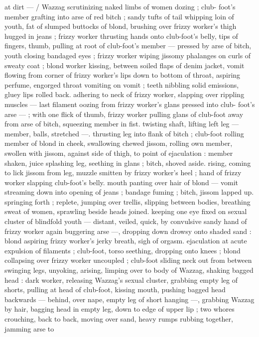 at dirt --- / Wazzag scrutinizing naked limbs of women dozing ; club-
foot's member grafting into arse of red bitch ; sandy tufts of tail
whipping loin of youth, fat of slumped buttocks of blond, brushing
over frizzy worker's thigh hugged in jeans ; frizzy worker thrusting
hands onto club-foot's belly, tips of fingers, thumb, pulling at root of
club-foot's member --- pressed by arse of bitch, youth closing
bandaged eyes ; frizzy worker wiping jissomy phalanges on curls of
sweaty coat ; blond worker kissing, between soiled flaps of denim
jacket, vomit flowing from corner of frizzy worker's lips down to
bottom of throat, aspiring perfume, engorged throat vomiting on
vomit ; teeth nibbling solid emissions, gluey lips rolled back.
adhering to neck of frizzy worker, slapping over rippling muscles ---
last filament oozing from frizzy worker's glans pressed into club-
foot's arse --- ; with one flick of thumb, frizzy worker pulling glans
of club-foot away from arse of bitch, squeezing member in fist.
twisting shaft, lifting left leg --- member, balls, stretched ---.
thrusting leg into flank of bitch ; club-foot rolling member of blond
in cheek, swallowing chewed jissom, rolling own member, swollen
with jissom, against side of thigh, to point of ejaculation : member
shaken, juice splashing leg, seething in glans ; bitch, shoved aside.
rising, coming to lick jissom from leg, muzzle smitten by frizzy
worker's heel ; hand of frizzy worker slapping club-foot's belly.
mouth panting over hair of blond --- vomit streaming down into
opening of jeans ; bandage fuming ; bitch, jissom lapped up.
springing forth ; replete, jumping over trellis, slipping between
bodies, breathing sweat of women, sprawling beside heads joined.
keeping one eye fixed on sexual cluster of blindfold youth ---
distant, veiled, quick, by convulsive sandy hand of frizzy worker
again buggering arse ---, dropping down drowsy onto shaded sand :
blond aspiring frizzy worker's jerky breath, sigh of orgasm.
ejaculation at acute expulsion of filaments ; club-foot, torso
seething, dropping onto knees ; blond collapsing over frizzy worker
uncoupled ; club-foot sliding neck out from between swinging legs,
unyoking, arising, limping over to body of Wazzag, shaking bagged
head : dark worker, releasing Wazzag's sexual cluster, grabbing
empty leg of shorts, pulling at head of club-foot, kissing mouth,
pushing bagged head backwards --- behind, over nape, empty leg of
short hanging ---, grabbing Wazzag by hair, bagging head in empty
leg, down to edge of upper lip ; two whores crouching, back to back,
moving over sand, heavy rumps rubbing together, jamming arse to
